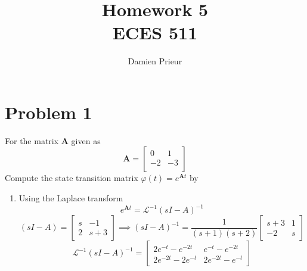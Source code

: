 \documentclass{article}
\author{Damien Prieur}
\title{Homework 5 \\ ECES 511}
\date{}
\begin{document}
\maketitle

\section*{Problem 1}
For the matrix $\mathbf{A}$ given as
$$
\mathbf{A}
=
\begin{bmatrix}
0 & 1 \\
-2 & -3 \\
\end{bmatrix}
$$
Compute the state transition matrix $\varphi (t) = e^{\mathbf{A}t}$ by
\begin{enumerate}[1.]
\item Using the Laplace transform
\newline
$$ e^{\mathbf{A}t} = \mathcal{L}^{-1}(sI-A)^{-1} $$
$$ (sI-A) =
\begin{bmatrix}
s  & -1 \\
2 & s+3
\end{bmatrix}
\implies
(sI-A)^{-1}
=
\frac{1}{(s+1)(s+2)}
\begin{bmatrix}
s+3  & 1 \\
-2 & s
\end{bmatrix}
$$
$$
\mathcal{L}^{-1}(sI-A)^{-1}
=
\begin{bmatrix}
2e^{-t}-e^{-2t}  & e^{-t}-e^{-2t} \\
2e^{-2t}-2e^{-t} & 2e^{-2t}-e^{-t}
\end{bmatrix}
$$


\end{enumerate}
\end{document}

